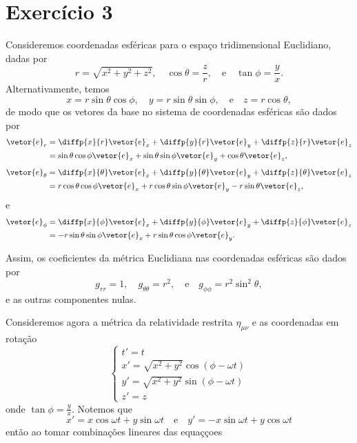 \section*{Exercício 3}
Consideremos coordenadas esféricas para o espaço tridimensional Euclidiano, dadas por
\begin{equation*}
    r = \sqrt{x^2 + y^2 + z^2},\quad \cos\theta = \frac{z}{r},\quad\text{e}\quad\tan\phi=\frac{y}{x}.
\end{equation*}
Alternativamente, temos
\begin{equation*}
    x = r\sin\theta\cos\phi,\quad y = r\sin\theta\sin\phi,\quad\text{e}\quad z = r\cos\theta,
\end{equation*}
de modo que os vetores da base no sistema de coordenadas esféricas são dados por
\begin{align*}
    \vetor{e}_r &= \diffp{x}{r}\vetor{e}_x + \diffp{y}{r}\vetor{e}_y + \diffp{z}{r}\vetor{e}_z\\
                &= \sin\theta\cos\phi\vetor{e}_x + \sin\theta\sin\phi\vetor{e}_y + \cos\theta \vetor{e}_z,
\end{align*}
\begin{align*}
    \vetor{e}_\theta &= \diffp{x}{\theta}\vetor{e}_x + \diffp{y}{\theta}\vetor{e}_y + \diffp{z}{\theta}\vetor{e}_z \\
                   &= r\cos\theta\cos\phi \vetor{e}_x + r\cos\theta\sin\phi\vetor{e}_y - r\sin\theta\vetor{e}_z,
\end{align*}
e
\begin{align*}
    \vetor{e}_\phi &= \diffp{x}{\phi}\vetor{e}_x + \diffp{y}{\phi}\vetor{e}_y + \diffp{z}{\phi}\vetor{e}_z\\
                   &= -r\sin\theta\sin\phi \vetor{e}_x + r\sin\theta\cos\phi\vetor{e}_y.
\end{align*}

Assim, os coeficientes da métrica Euclidiana nas coordenadas esféricas são dados por
\begin{equation*}
    g_{rr} = 1, \quad g_{\theta\theta} = r^2, \quad\text{e}\quad g_{\phi\phi} = r^2\sin^2\theta,
\end{equation*}
e as outras componentes nulas.

Consideremos agora a métrica da relatividade restrita \(\eta_{\mu\nu}\) e as coordenadas em rotação
\begin{equation*}
    \begin{cases}
        t' = t\\
        x' = \sqrt{x^2 + y^2}\cos{(\phi - \omega t)}\\
        y' = \sqrt{x^2 + y^2}\sin{(\phi - \omega t)}\\
        z' = z
    \end{cases}
\end{equation*}
onde \(\tan\phi = \frac{y}{x}\). Notemos que
\begin{equation*}
    x' = x\cos{\omega t} + y\sin{\omega t}\quad\text{e}\quad y' = -x\sin{\omega t} + y\cos{\omega t}
\end{equation*}
então ao tomar combinações lineares das equaççoes
